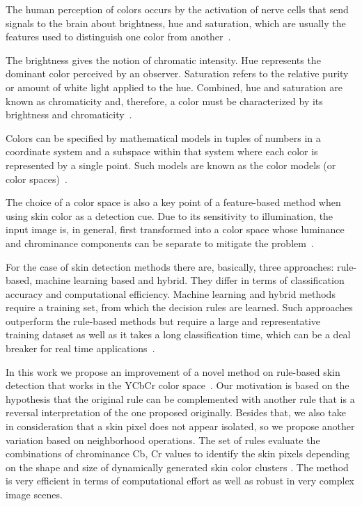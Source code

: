 The human perception of colors occurs by the activation of nerve cells that send signals to the brain about brightness, hue and saturation, which are usually the features used to distinguish one color from another~\citep{gonzalez:02}.

The brightness gives the notion of chromatic intensity. Hue represents the dominant color perceived by an observer. Saturation refers to the relative purity or amount of white light applied to the hue. Combined, hue and saturation are known as chromaticity and, therefore, a color must be characterized by its brightness and chromaticity~\citep{gonzalez:02}.

Colors can be specified by mathematical models in tuples of numbers in a coordinate system and a subspace within that system where each color is represented by a single point. Such models are known as the color models (or color spaces)~\citep{gonzalez:02}.

The choice of a color space is also a key point of a feature-based method when using skin color as a detection cue. Due to its sensitivity to illumination, the input image is, in general, first transformed into a color space whose luminance and chrominance components can be separate to mitigate the problem~\citep{vezhnevets:03}.

For the case of skin detection methods there are, basically, three approaches: rule-based, machine learning based and hybrid. They differ in terms of classification accuracy and computational efficiency. Machine learning and hybrid methods require a training set, from which the decision rules are learned. Such approaches outperform the rule-based methods but require a large and representative training dataset as well as it takes a long classification time, which can be a deal breaker for real time applications~\citep{kakumanu:07}.

In this work we propose an improvement of a novel method on rule-based skin detection that works in the YCbCr color space~\citep{brancati:17}. Our motivation is based on the hypothesis that the original rule can be complemented with another rule that is a reversal interpretation of the one proposed originally. Besides that, we also take in consideration that a skin pixel does not appear isolated, so we propose another variation based on neighborhood operations. The set of rules evaluate the combinations of chrominance Cb, Cr values to identify the skin pixels depending on the shape and size of dynamically generated skin color clusters \citep{brancati:17}. The method is very efficient in terms of computational effort as well as robust in very complex image scenes.


